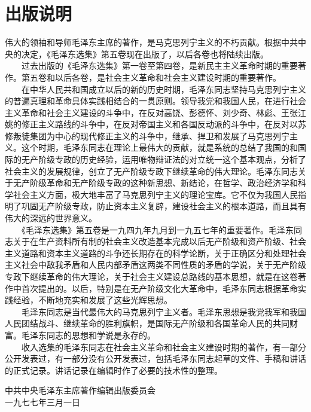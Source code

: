 \documentclass[cn,11pt,chinese]{elegantbook}
\def\myformat#1{\hfil\hfil #1}
\begin{document}
\section*{\myformat{出版说明}}
伟大的领袖和导师毛泽东主席的著作，是马克思列宁主义的不朽贡献。根据中共中央的决定，《毛泽东选集》第五卷现在出版了，以后各卷也将陆续出版。\\
　　过去出版的《毛泽东选集》第一卷至第四卷，是新民主主义革命时期的重要著作。第五卷和以后各卷，是社会主义革命和社会主义建设时期的重要著作。\\
　　在中华人民共和国成立以后的新的历史时期，毛泽东同志坚持马克思列宁主义的普遍真理和革命具体实践相结合的一贯原则。领导我党和我国人民，在进行社会主义革命和社会主义建设的斗争中，在反对高饶、彭德怀、刘少奇、林彪、王张江姚的修正主义路线的斗争中，在反对帝国主义和各国反动派的斗争中，在反对以苏修叛徒集团为中心的现代修正主义的斗争中，继承、捍卫和发展了马克思列宁主义。这个时期，毛泽东同志在理论上最伟大的贡献，就是系统的总结了我国的和国际的无产阶级专政的历史经验，运用唯物辩证法的对立统一这个基本观点，分析了社会主义的发展规律，创立了无产阶级专政下继续革命的伟大理论。毛泽东同志关于无产阶级革命和无产阶级专政的这种新思想、新结论，在哲学、政治经济学和科学社会主义方面，极大地丰富了马克思列宁主义的理论宝库。它不仅为我国人民指明了巩固无产阶级专政，防止资本主义复辟，建设社会主义的根本道路，而且具有伟大的深远的世界意义。\\
　　《毛泽东选集》第五卷是一九四九年九月到一九五七年的重要著作。毛泽东同志关于在生产资料所有制的社会主义改造基本完成以后无产阶级和资产阶级、社会主义道路和资本主义道路的斗争还长期存在的科学论断，关于正确区分和处理社会主义社会中敌我矛盾和人民内部矛盾这两类不同性质的矛盾的学说，关于无产阶级专政下继续革命的伟大理论，关于社会主义建设总路线的基本思想，就是在这卷著作中首次提出的。以后，特别是在无产阶级文化大革命中，毛泽东同志根据革命实践经验，不断地充实和发展了这些光辉思想。\\
　　毛泽东同志是当代最伟大的马克思列宁主义者。毛泽东思想是我党我军和我国人民团结战斗、继续革命的胜利旗帜，是国际无产阶级和各国革命人民的共同财富。毛泽东同志的思想和学说是永存的。\\
　　收入选集的毛泽东同志在社会主义革命和社会主义建设时期的著作，有一部分公开发表过，有一部分没有公开发表过，包括毛泽东同志起草的文件、手稿和讲话的正式记录。讲话记录在编辑时作了必要的技术性的整理。

\begin{flushright}
中共中央毛泽东主席著作编辑出版委员会\\
一九七七年三月一日　
\end{flushright}
\end{document}
